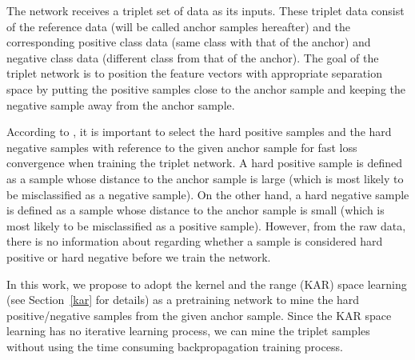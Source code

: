 \documentclass[sigconf]{acmart}
\begin{document}
The network receives a triplet set of data as its inputs. These triplet data consist of the reference data (will be called anchor samples hereafter) and the corresponding positive class data (same class with that of the anchor) and negative class data (different class from that of the anchor). The goal of the triplet network is to position the feature vectors with appropriate separation space by putting the positive samples close to the anchor sample and keeping the negative sample away from the anchor sample.

According to \cite{schroff2015facenet}, it is important to select the hard positive samples and the hard negative samples with reference to the given anchor sample for fast loss convergence when training the triplet network.
A hard positive sample is defined as a sample whose distance to the anchor sample is large (which is most likely to be misclassified as a negative sample). On the other hand, a hard negative sample is defined as a sample whose distance to the anchor sample is small (which is most likely to be misclassified as a positive sample). However, from the raw data, there is no information about regarding whether a sample is considered hard positive or hard negative before we train the network.

In this work, we propose to adopt the kernel and the range (KAR) space learning (see Section~\ref{kar} for details) as a pretraining network to mine the hard positive/negative samples from the given anchor sample. Since the KAR space learning has no iterative learning process, we can mine the triplet samples without using the time consuming backpropagation training process.
 
\end{document}
